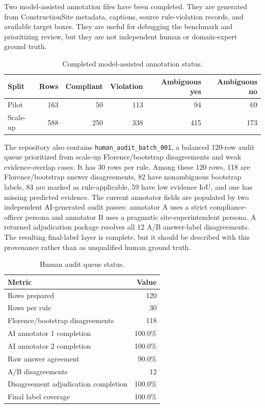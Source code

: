 Two model-assisted annotation files have been completed. They are generated from ConstructionSite metadata, captions, source rule-violation records, and available target boxes. They are useful for debugging the benchmark and prioritizing review, but they are not independent human or domain-expert ground truth.

\begin{table}[h]
\centering
\caption{Completed model-assisted annotation status.}
\begin{tabular}{lrrrrr}
\toprule
Split & Rows & Compliant & Violation & Ambiguous yes & Ambiguous no \\
\midrule
Pilot & 163 & 50 & 113 & 94 & 69 \\
Scale-up & 588 & 250 & 338 & 415 & 173 \\
\bottomrule
\end{tabular}
\end{table}

The repository also contains \texttt{human\_audit\_batch\_001}, a balanced 120-row audit queue prioritized from scale-up Florence/bootstrap disagreements and weak evidence-overlap cases. It has 30 rows per rule. Among these 120 rows, 118 are Florence/bootstrap answer disagreements, 82 have nonambiguous bootstrap labels, 83 are marked as rule-applicable, 59 have low evidence IoU, and one has missing predicted evidence. The current annotator fields are populated by two independent AI-generated audit passes: annotator A uses a strict compliance-officer persona and annotator B uses a pragmatic site-superintendent persona. A returned adjudication package resolves all 12 A/B answer-label disagreements. The resulting final-label layer is complete, but it should be described with this provenance rather than as unqualified human ground truth.

\begin{table}[h]
\centering
\caption{Human audit queue status.}
\begin{tabular}{lr}
\toprule
Metric & Value \\
\midrule
Rows prepared & 120 \\
Rows per rule & 30 \\
Florence/bootstrap disagreements & 118 \\
AI annotator 1 completion & 100.0\% \\
AI annotator 2 completion & 100.0\% \\
Raw answer agreement & 90.0\% \\
A/B disagreements & 12 \\
Disagreement adjudication completion & 100.0\% \\
Final label coverage & 100.0\% \\
\bottomrule
\end{tabular}
\end{table}

